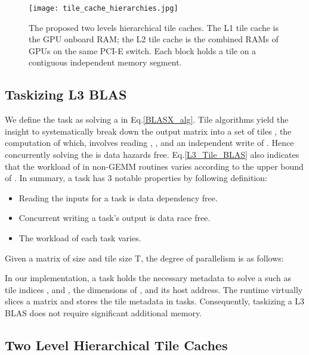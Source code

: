 \documentclass[conference]{IEEEtran}
\begin{document}
\begin{figure}[!t]
\centering
\texttt{[image: tile\_cache\_hierarchies.jpg]}
\caption{The proposed two levels hierarchical tile caches. The L1 tile cache is the GPU onboard RAM; 
the L2 tile cache is the combined RAMs of GPUs on the same PCI-E switch. Each block holds a 
tile on a contiguous independent memory segment.}
\label{tile_caching}
\vspace{-0.25in}
\end{figure}

\vspace{-0.12in}
\subsection{Taskizing L3 BLAS}
\vspace{-0.05in}

We define the task as solving a  in Eq.\ref{BLASX_alg}.
Tile algorithms yield the insight to systematically break down the output matrix  
into a set of tiles , the computation of which, involves reading , 
,  and an independent write of . Hence 
concurrently solving the  is data hazards free. Eq.\ref{L3_Tile_BLAS} 
also indicates that the workload of  in non-GEMM routines varies 
according to the upper bound of . In summary, a task has 3 notable properties by following definition:
\begin{itemize}
\vspace{-0.1in}
\item Reading the inputs for a task is data dependency free.
\item Concurrent writing a task's output is data race free.
\item The workload of each task varies.
\end{itemize}
\vspace{-0.1in}
Given a matrix  of size  and tile size T, the degree of parallelism is as follows:
\vspace{-0.1in}

In our implementation, a task holds the necessary metadata to solve a  such as tile
indices ,  and , the dimensions of  , and its host address. 
The runtime virtually slices a matrix and stores the tile metadata in tasks. Consequently, taskizing a L3 
BLAS does not require significant additional memory.

\vspace{-0.12in}
\subsection{Two Level Hierarchical Tile Caches}
\vspace{-0.05in}
\end{document}
